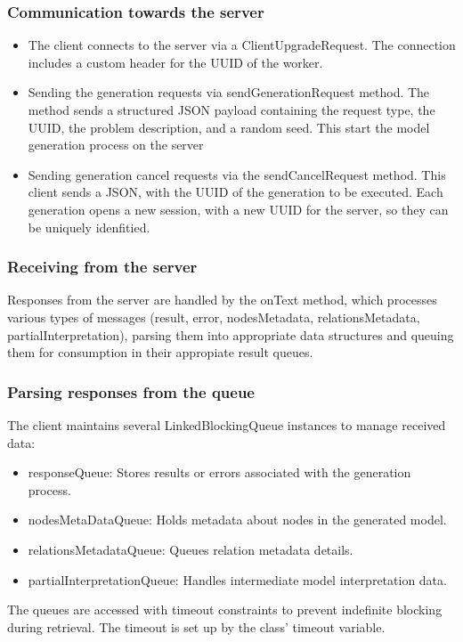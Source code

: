 			\subsubsection{Communication towards the server} 
				\begin{itemize}
					\item The client connects to the server via a ClientUpgradeRequest. The connection includes a custom header for the UUID of the worker.
					\item Sending the generation requests via sendGenerationRequest method. The method sends a structured JSON payload containing the request type,
					the UUID, the problem description, and a random seed. This start the model generation process on the server
					\item Sending generation cancel requests via the sendCancelRequest method. This client sends a JSON, with the UUID of the generation to be 
					executed. Each generation opens a new session, with a new UUID for the server, so they can be uniquely idenfitied.
				\end{itemize} 
			\subsubsection{Receiving from the server} 
				Responses from the server are handled by the onText method, which processes various types of messages 
				(result, error, nodesMetadata, relationsMetadata, partialInterpretation), parsing them into appropriate data 
				structures and queuing them for consumption in their appropiate result queues.

			\subsubsection{Parsing responses from the queue} 
				The client maintains several LinkedBlockingQueue instances to manage received data:
				\begin{itemize}
					\item responseQueue: Stores results or errors associated with the generation process.
					\item nodesMetaDataQueue: Holds metadata about nodes in the generated model.
					\item relationsMetadataQueue: Queues relation metadata details.
					\item partialInterpretationQueue: Handles intermediate model interpretation data.
				\end{itemize} 
				The queues are accessed with timeout constraints to prevent indefinite blocking during retrieval. The timeout is set up by the class'
				timeout variable. 
				
